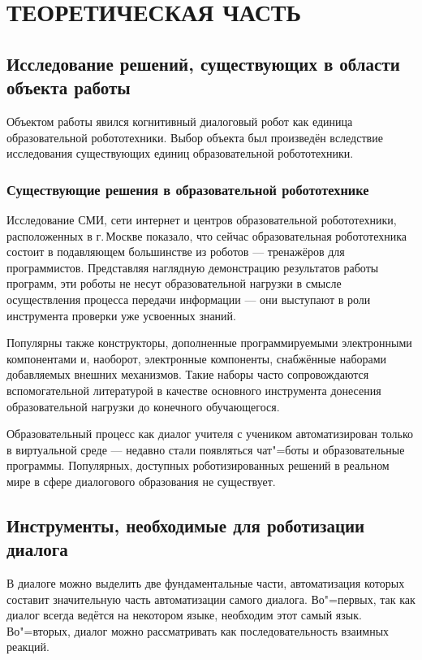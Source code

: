 \clearpage
\chapter{ТЕОРЕТИЧЕСКАЯ ЧАСТЬ}

\section{Исследование решений, существующих в области объекта работы}

Объектом работы явился когнитивный диалоговый робот как единица образовательной робототехники. Выбор объекта был произведён вследствие исследования существующих единиц образовательной робототехники.

\subsection{Существующие решения в образовательной робототехнике}

Исследование СМИ, сети интернет и центров образовательной робототехники, расположенных в г.\,Москве показало, что сейчас образовательная робототехника состоит в подавляющем большинстве из роботов --- тренажёров для программистов. Представляя наглядную демонстрацию результатов работы программ, эти роботы не несут образовательной нагрузки в смысле осуществления процесса передачи информации --- они выступают в роли инструмента проверки уже усвоенных знаний. 

Популярны также конструкторы, дополненные программируемыми электронными компонентами и, наоборот, электронные компоненты, снабжённые наборами добавляемых внешних механизмов. Такие наборы часто сопровождаются вспомогательной литературой в качестве основного инструмента донесения образовательной нагрузки до конечного обучающегося.

Образовательный процесс как диалог учителя с учеником автоматизирован только в виртуальной среде --- недавно стали появляться чат"=боты и образовательные программы. Популярных, доступных роботизированных решений в реальном мире в сфере диалогового образования не существует.

\section{Инструменты, необходимые для роботизации диалога}\label{dialogue-instruments}
В диалоге можно выделить две фундаментальные части, автоматизация которых составит значительную часть автоматизации самого диалога. Во"=первых, так как диалог всегда ведётся на некотором языке, необходим этот самый язык. Во"=вторых, диалог можно рассматривать как последовательность взаимных реакций.


